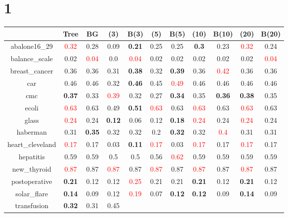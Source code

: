 \documentclass{article}%
\begin{document}
\section*{1}%
\begin{tabular}{c|cccccccccc}%
\hline%
&Tree&BG&(3)&B(3)&(5)&B(5)&(10)&B(10)&(20)&B(20)\\%
\hline%
abalone16\_29&\textcolor{red}{ 
0.32
}&0.28&0.09&\textbf{0.21}&0.25&0.25&\textbf{0.3}&0.23&\textcolor{red}{ 
0.32
}&0.24\\%
\hline%
balance\_scale&0.02&\textcolor{red}{ 
0.04
}&0.0&\textcolor{red}{ 
0.04
}&0.02&0.02&0.02&0.02&0.02&\textcolor{red}{ 
0.04
}\\%
\hline%
breast\_cancer&0.36&0.36&0.31&\textbf{0.38}&0.32&\textbf{0.39}&0.36&\textcolor{red}{ 
0.42
}&0.36&0.36\\%
\hline%
car&0.46&0.46&0.32&\textbf{0.46}&0.45&\textcolor{red}{ 
0.49
}&0.46&0.46&0.46&0.46\\%
\hline%
cmc&\textbf{0.37}&0.33&\textcolor{red}{ 
0.39
}&0.32&0.27&\textbf{0.34}&0.35&\textbf{0.36}&\textbf{0.38}&0.35\\%
\hline%
ecoli&\textcolor{red}{ 
0.63
}&0.63&0.49&\textbf{0.51}&\textcolor{red}{ 
0.63
}&0.63&\textcolor{red}{ 
0.63
}&0.63&\textcolor{red}{ 
0.63
}&0.63\\%
\hline%
glass&\textcolor{red}{ 
0.24
}&0.24&\textbf{0.12}&0.06&0.12&\textbf{0.18}&\textcolor{red}{ 
0.24
}&0.24&\textcolor{red}{ 
0.24
}&0.24\\%
\hline%
haberman&0.31&\textbf{0.35}&0.32&0.32&0.2&\textbf{0.32}&0.32&\textcolor{red}{ 
0.4
}&0.31&0.31\\%
\hline%
heart\_cleveland&\textcolor{red}{ 
0.17
}&0.17&0.03&\textbf{0.11}&\textcolor{red}{ 
0.17
}&0.03&\textcolor{red}{ 
0.17
}&0.17&\textcolor{red}{ 
0.17
}&0.17\\%
\hline%
hepatitis&0.59&0.59&0.5&0.5&0.56&\textcolor{red}{ 
0.62
}&0.59&0.59&0.59&0.59\\%
\hline%
new\_thyroid&\textcolor{red}{ 
0.87
}&0.87&\textcolor{red}{ 
0.87
}&0.87&\textcolor{red}{ 
0.87
}&0.87&\textcolor{red}{ 
0.87
}&0.87&\textcolor{red}{ 
0.87
}&0.87\\%
\hline%
postoperative&\textbf{0.21}&0.12&0.12&\textcolor{red}{ 
0.25
}&0.21&0.21&\textbf{0.21}&0.12&\textbf{0.21}&0.12\\%
\hline%
solar\_flare&\textbf{0.14}&0.09&0.12&\textcolor{red}{ 
0.19
}&0.07&\textbf{0.12}&\textbf{0.12}&0.09&\textbf{0.14}&0.09\\%
\hline%
transfusion&\textbf{0.32}&0.31&0.45&\textcolor{red}{ 
}
\end{tabular}
\end{document}
